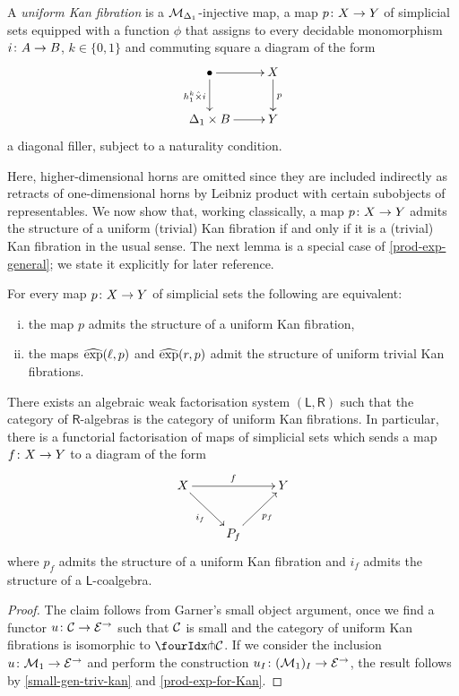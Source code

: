 \documentclass[reqno,10pt,a4paper,oneside]{amsart}
\begin{document}
\begin{definition} A \emph{uniform Kan fibration} is a $\cal{M}_{\Delta_1}$-injective map, \ie 
a map  $p \co X \to Y$ of simplicial sets equipped with a function $\phi$ that assigns
to every decidable monomorphism $i \co A \to B$, $k \in \{0, 1\}$  and commuting
square a diagram of the form
\[
\xymatrix{
\bullet \ar[r] \ar[d]_{h^k_1 \hattimes i} & X \ar[d]^p \\
\Delta_1 \times B \ar[r] & Y }
\]
a diagonal filler, subject to a naturality condition. 
\end{definition} 


Here, higher-dimensional horns are omitted since they are included indirectly as retracts of one-dimensional horns 
by Leibniz product with certain subobjects of representables. We now show that, working classically, a map $p \co X \to Y$ admits the structure of a uniform (trivial) Kan fibration if and only if it is a (trivial) Kan fibration in the usual sense. 
The next lemma is a special case of \cref{prod-exp-general}; we state it explicitly for later reference.
  
 \begin{lemma} \label{prod-exp-for-Kan}  For every  map $p \co X \to Y$ of simplicial sets the following are equivalent: 
\begin{enumerate}[(i)]
\item the map $p$ admits the structure of a uniform Kan fibration,
\item the maps $\hatexp(\intervall, p)$ and $\hatexp(\intervalr, p)$ admit the structure of
uniform trivial Kan fibrations. 
\end{enumerate} 
\end{lemma}

\begin{proposition} There exists an algebraic weak factorisation system $(\mathsf{L}, \mathsf{R})$
such that the category of $\mathsf{R}$-algebras is the category of uniform Kan fibrations. 
In particular, there is a functorial factorisation of maps of simplicial sets which sends
a map $f \co X \to Y$ to a diagram of the form
\[
\xymatrix{ 
X \ar[rr]^f \ar[dr]_{i_f}  & & Y \\
 & P_f \ar[ur]_{p_f} }
 \]
 where $p_f$ admits the structure of  a uniform Kan fibration and 
 $i_f$ admits the structure of a $\mathsf{L}$-coalgebra.
\end{proposition} 

\begin{proof} The claim follows from Garner's small object argument, once we find a 
functor $u \co \cal{C} \rightarrow \catE^\to$ such that $\cal{C}$ is small and the
category of uniform Kan fibrations is isomorphic to $\liftr{\cal{C}}$. If we consider
the inclusion $u \co \mathcal{M}_1 \to \cal{E}^\to$ and perform the construction
$u_\interval \co (\mathcal{M}_1)_\interval \to \catE^\to$, the result follows 
by \cref{small-gen-triv-kan} and \cref{prod-exp-for-Kan}. 
\end{proof}
\end{document}
